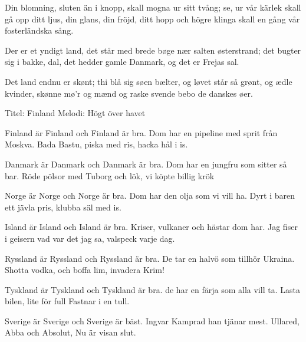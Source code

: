 Din blomning, sluten än i knopp, 
skall mogna ur sitt tvång; 
se, ur vår kärlek skall gå opp
ditt ljus, din glans, din fröjd, ditt hopp 
och högre klinga skall en gång 
vår fosterländska sång. 






\songtext{}Der er et yndigt land,
det står med brede bøge
\leftrepeat nær salten østerstrand; \rightrepeat
det bugter sig i bakke, dal,
det hedder gamle Danmark,
\leftrepeat og det er Frejas sal. \rightrepeat

Det land endnu er skønt;
thi blå sig søen bælter,
\leftrepeat og løvet står så grønt, \rightrepeat
og ædle kvinder, skønne mø'r
og mænd og raske svende
\leftrepeat bebo de danskes øer. \rightrepeat





\songtext{}Titel: Finland
Melodi: Högt över havet

Finland är Finland och Finland är bra.
Dom har en pipeline med sprit från Moskva.
Bada Bastu, piska med ris,
hacka hål i is.
 
Danmark är Danmark och Danmark är bra.
Dom har en jungfru som sitter så bar.
Röde pölsor med Tuborg och lök,
vi köpte billig krök
 
Norge är Norge och Norge är bra.
Dom har den olja som vi vill ha.
Dyrt i baren ett jävla pris,
klubba säl med is.
 
Island är Island och Island är bra.
Kriser, vulkaner och hästar dom har.
Jag fiser i geisern vad var det jag sa, valspeck varje dag.

Ryssland är Ryssland och Ryssland är bra.
De tar en halvö som tillhör Ukraina.
Shotta vodka, och boffa lim,
invadera Krim!

Tyskland är Tyskland och Tyskland är bra.
de har en färja som alla vill ta.
Lasta bilen, lite för full
Fastnar i en tull.
 
Sverige är Sverige och Sverige är bäst.
Ingvar Kamprad han tjänar mest.
Ullared, Abba och Absolut,
Nu är visan slut.







